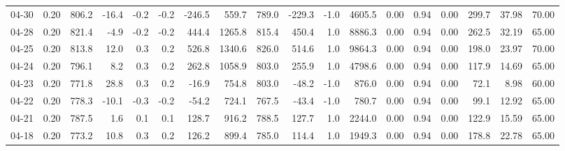 \begin{threeparttable}
{\begin{tabular}{lrrrrrrrrrrrrrrrrr}
  04-30 &     0.20 & 806.2 &             -16.4 &              -0.2 &               -0.2 &             -246.5 &  559.7 & 789.0 &     -229.3 &                     -1.0 &              4605.5 &       0.00 &      0.94 &           0.00 &            299.7 &           37.98 &                  70.00 \\
  04-28 &     0.20 & 821.4 &              -4.9 &              -0.2 &               -0.2 &              444.4 & 1265.8 & 815.4 &      450.4 &                      1.0 &              8886.3 &       0.00 &      0.94 &           0.00 &            262.5 &           32.19 &                  65.00 \\
  04-25 &     0.20 & 813.8 &              12.0 &               0.3 &                0.2 &              526.8 & 1340.6 & 826.0 &      514.6 &                      1.0 &              9864.3 &       0.00 &      0.94 &           0.00 &            198.0 &           23.97 &                  70.00 \\
  04-24 &     0.20 & 796.1 &               8.2 &               0.3 &                0.2 &              262.8 & 1058.9 & 803.0 &      255.9 &                      1.0 &              4798.6 &       0.00 &      0.94 &           0.00 &            117.9 &           14.69 &                  65.00 \\
  04-23 &     0.20 & 771.8 &              28.8 &               0.3 &                0.2 &              -16.9 &  754.8 & 803.0 &      -48.2 &                     -1.0 &               876.0 &       0.00 &      0.94 &           0.00 &             72.1 &            8.98 &                  60.00 \\
  04-22 &     0.20 & 778.3 &             -10.1 &              -0.3 &               -0.2 &              -54.2 &  724.1 & 767.5 &      -43.4 &                     -1.0 &               780.7 &       0.00 &      0.94 &           0.00 &             99.1 &           12.92 &                  65.00 \\
  04-21 &     0.20 & 787.5 &               1.6 &               0.1 &                0.1 &              128.7 &  916.2 & 788.5 &      127.7 &                      1.0 &              2244.0 &       0.00 &      0.94 &           0.00 &            122.9 &           15.59 &                  65.00 \\
  04-18 &     0.20 & 773.2 &              10.8 &               0.3 &                0.2 &              126.2 &  899.4 & 785.0 &      114.4 &                      1.0 &              1949.3 &       0.00 &      0.94 &           0.00 &            178.8 &           22.78 &                  65.00 \\

\end{tabular}}
\end{threeparttable}
